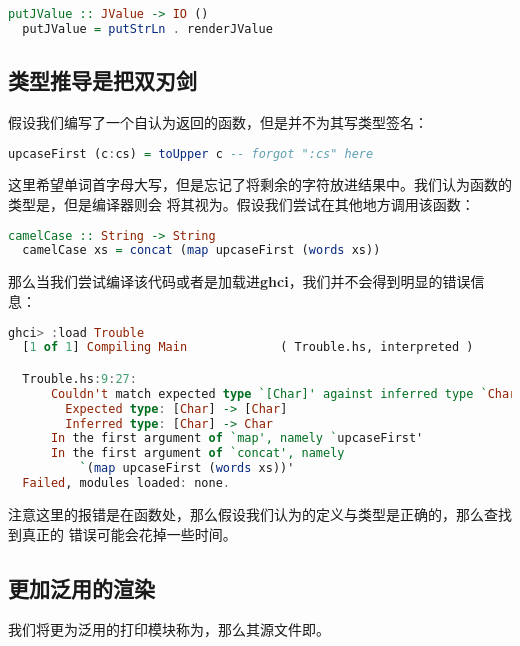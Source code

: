 \documentclass[./main.tex]{subfiles}
\begin{document}
\begin{lstlisting}[language=Haskell]
  putJValue :: JValue -> IO ()
  putJValue = putStrLn . renderJValue
\end{lstlisting}

\subsection*{类型推导是把双刃剑}

假设我们编写了一个自认为返回的函数，但是并不为其写类型签名：

\begin{lstlisting}[language=Haskell]
  upcaseFirst (c:cs) = toUpper c -- forgot ":cs" here
\end{lstlisting}

这里希望单词首字母大写，但是忘记了将剩余的字符放进结果中。我们认为函数的类型是，但是编译器则会
将其视为。假设我们尝试在其他地方调用该函数：

\begin{lstlisting}[language=Haskell]
  camelCase :: String -> String
  camelCase xs = concat (map upcaseFirst (words xs))
\end{lstlisting}

那么当我们尝试编译该代码或者是加载进\textbf{ghci}，我们并不会得到明显的错误信息：

\begin{lstlisting}[language=Haskell]
  ghci> :load Trouble
  [1 of 1] Compiling Main             ( Trouble.hs, interpreted )

  Trouble.hs:9:27:
      Couldn't match expected type `[Char]' against inferred type `Char'
        Expected type: [Char] -> [Char]
        Inferred type: [Char] -> Char
      In the first argument of `map', namely `upcaseFirst'
      In the first argument of `concat', namely
          `(map upcaseFirst (words xs))'
  Failed, modules loaded: none.
\end{lstlisting}

注意这里的报错是在函数处，那么假设我们认为的定义与类型是正确的，那么查找到真正的
错误可能会花掉一些时间。

\subsection*{更加泛用的渲染}

我们将更为泛用的打印模块称为，那么其源文件即。
\end{document}
